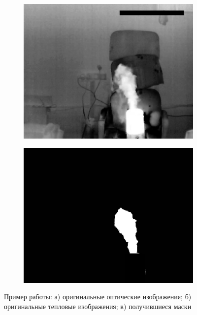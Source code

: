 \documentclass[14pt, a4paper]{extreport}
\begin{document}
\begin{figure}[h!]
\begin{subfigure}{.32\textwidth}
			\includegraphics[width = \textwidth]{image/chapter_3/examples/tep/240}
			\caption{}
		\end{subfigure}
		\hspace{0.1cm}
		\begin{subfigure}{.32\textwidth}
			\centering
			\includegraphics[width = \textwidth]{image/chapter_3/examples/mask/240}
			\caption{}
		\end{subfigure}
		\caption{Пример работы: а) оригинальные оптические изображения; б) оригинальные тепловые изображения; в) получившиеся маски}
		\label{fig:test_segm}
	\end{figure}
	
\end{document}
